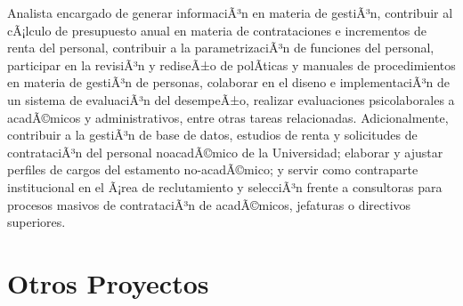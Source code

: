 \documentclass[11pt,a4paper,]{awesome-cv}
\begin{document}
\begin{cventries}
{\begin{cvitems}
\item Analista encargado de generar informaciÃ³n en materia de gestiÃ³n, contribuir al cÃ¡lculo de presupuesto anual en materia de contrataciones e incrementos de renta del personal, contribuir a la parametrizaciÃ³n de funciones del personal, participar en la revisiÃ³n y rediseÃ±o de polÃ­ticas y manuales de procedimientos en materia de gestiÃ³n de personas, colaborar en el diseno e implementaciÃ³n de un sistema de evaluaciÃ³n del desempeÃ±o, realizar evaluaciones psicolaborales a acadÃ©micos y administrativos, entre otras tareas relacionadas. Adicionalmente, contribuir a la gestiÃ³n de base de datos, estudios de renta y solicitudes de contrataciÃ³n del personal noacadÃ©mico de la Universidad; elaborar y ajustar perfiles de cargos del estamento no-acadÃ©mico; y servir como contraparte institucional en el Ã¡rea de reclutamiento y selecciÃ³n frente a consultoras para procesos masivos de contrataciÃ³n de acadÃ©micos, jefaturas o directivos superiores.
\end{cvitems}}
\end{cventries}

\pagebreak

\hypertarget{otros-proyectos}{%
\section{Otros Proyectos}\label{otros-proyectos}}
\end{document}

